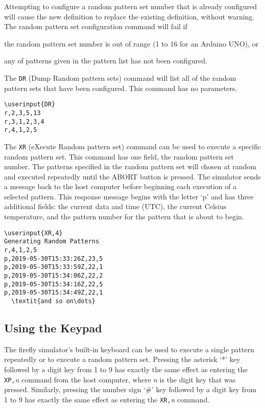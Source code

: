 \documentclass[letterpaper,11pt]{article}
\newcommand\userinput[1]{\textbf{#1}}
\begin{document}
Attempting to configure a random pattern set number that is already configured
will cause the new definition to replace the existing definition, without
warning. The random pattern set configuration command will fail if
\begin{compactitem}
  \item the random pattern set number is out of range (1 to 16 for an Arduino
    UNO), or
  \item any of patterns given in the pattern list has not been configured.
\end{compactitem}

The \texttt{DR} (Dump Random pattern sets) command will list all of the random
pattern sets that have been configured. This command has no parameters.
\begin{tcolorbox}
\begin{Verbatim}[commandchars=\\\{\}]
\userinput{DR}
r,2,3,5,13
r,3,1,2,3,4
r,4,1,2,5
\end{Verbatim}
\end{tcolorbox}

The \texttt{XR} (eXecute Random pattern set) command can be used to execute a
specific random pattern set. This command has one field, the random pattern set
number. The patterns specified in the random pattern set will chosen at random
and executed repeatedly until the \textsf{ABORT} button is pressed. The
simulator sends a message back to the host computer before beginning each
execution of a selected pattern. This response message begins with the letter
`p' and has three additional fields: the current data and time (UTC), the
current Celsius temperature, and the pattern number for the pattern that
is about to begin.

\begin{tcolorbox}
\begin{Verbatim}[commandchars=\\\{\}]
\userinput{XR,4}
Generating Random Patterns
r,4,1,2,5
p,2019-05-30T15:33:26Z,23,5
p,2019-05-30T15:33:59Z,22,1
p,2019-05-30T15:34:06Z,22,2
p,2019-05-30T15:34:16Z,22,5
p,2019-05-30T15:34:49Z,22,1
  \textit{and so on\dots}
\end{Verbatim}
\end{tcolorbox}

\subsection*{Using the Keypad}

The firefly simulator's built-in keyboard can be used to execute a single
pattern repeatedly or to execute a random pattern set. Pressing the asterisk
`*' key followed by a digit key from 1 to 9 has exactly the same effect as
entering the \texttt{XP,}\textit{n} command from the host computer, where
\textit{n} is the digit key that was pressed. Similarly, pressing the number
sign `\#' key followed by a digit key from 1 to 9 has exactly the same effect
as entering the \texttt{XR,}\textit{n} command.
\end{document}
